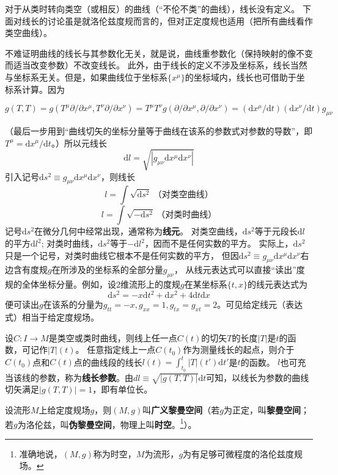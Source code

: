 对于从类时转向类空（或相反）的曲线（``不伦不类''的曲线），线长没有定义。
下面对线长的讨论虽是就洛伦兹度规而言的，但对正定度规也适用（把所有曲线看作类空曲线）。

不难证明曲线的线长与其参数化无关，就是说，曲线重参数化（保持映射的像不变而适当改变参数）不改变线长。
此外，由于线长的定义不涉及坐标系，线长当然与坐标系无关。但是，如果曲线位于坐标系$\{x^\mu\}$的坐标域内，线长也可借助于坐标系计算。因为

$g(T, T) = g(T^\mu\partial / \partial x^\mu, T^\nu\partial / \partial x^\nu) = T^\mu T^\nu g(\partial / \partial x^\mu, \partial / \partial x^\nu) = (\mathrm{d}x^\mu / \mathrm{d}t)(\mathrm{d}x^\nu / \mathrm{d}t)g_{\mu\nu}$

（最后一步用到``曲线切矢的坐标分量等于曲线在该系的参数式对参数的导数''，即$T^\mu = \mathrm{d}x^\mu / \mathrm{d}t$。）所以元线长
$$\mathrm{d}l = \sqrt{|g_{\mu\nu}\mathrm{d}x^\mu\mathrm{d}x^\nu|}$$
引入记号$\mathrm{d}s^2 \equiv g_{\mu\nu}\mathrm{d}x^\mu\mathrm{d}x^\nu$，则线长
$$l = \int\sqrt{\mathrm{d}s^2} ~ \text{（对类空曲线）} $$
$$l = \int\sqrt{-\mathrm{d}s^2} ~ \text{（对类时曲线）} $$
记号$\mathrm{d}s^2$在微分几何中经常出现，通常称为\textbf{线元}。
对类空曲线，$\mathrm{d}s^2$等于元段长$\mathrm{d}l$的平方$\mathrm{d}l^2$;
对类时曲线，$\mathrm{d}s^2$等于$-\mathrm{d}l^2$，因而不是任何实数的平方。
实际上，$\mathrm{d}s^2$只是一个记号，对类时曲线它根本不是任何实数的平方，
但因$\mathrm{d}s^2 \equiv g_{\mu\nu}\mathrm{d}x^\mu \mathrm{d}x^\nu$右边含有度规$g$在所涉及的坐标系的全部分量$g_{\mu\nu}$，
从线元表达式可以直接``读出''度规的全体坐标分量。例如，设$2$维流形上的度规$g$在某坐标系$\{t, x\}$的线元表达式为
$$\mathrm{d}s^2 = -x\mathrm{d}t^2 + \mathrm{d}x^2 + 4\mathrm{d}t\mathrm{d}x$$
便可读出$g$在该系的分量为$g_{tt} = -x, g_{xx} = 1, g_{tx} = g_{xt} = 2$。可见给定线元（表达式）相当于给定度规场。

设$C \colon I \to M$是类空或类时曲线，则线上任一点$C(t)$的切矢$T$的长度$|T|$是$t$的函数，可记作$|T|(t)$。
任意指定线上一点$C(t_0)$作为测量线长的起点，则介于$C(t_0)$点和$C(t)$点的曲线段的线长$l(t) = \int^t_{t_0}|T|(t')\mathrm{d}t'$是$t$的函数。
$l$也可充当该线的参数，称为\textbf{线长参数}。由$dl \equiv \sqrt{|g(T, T)|}\mathrm{d}t$可知，以线长为参数的曲线切矢满足$|g(T, T)| = 1$，即有单位长。

\begin{definition}
设流形$M$上给定度规场$g$，则$(M, g)$叫\textbf{广义黎曼空间}（若$g$为正定，叫\textbf{黎曼空间}；若$g$为洛伦兹，叫\textbf{伪黎曼空间}，物理上叫\textbf{时空}。\footnote{
准确地说，$(M, g)$称为时空，$M$为流形，$g$为有足够可微程度的洛伦兹度规场。
}）。
\end{definition}

